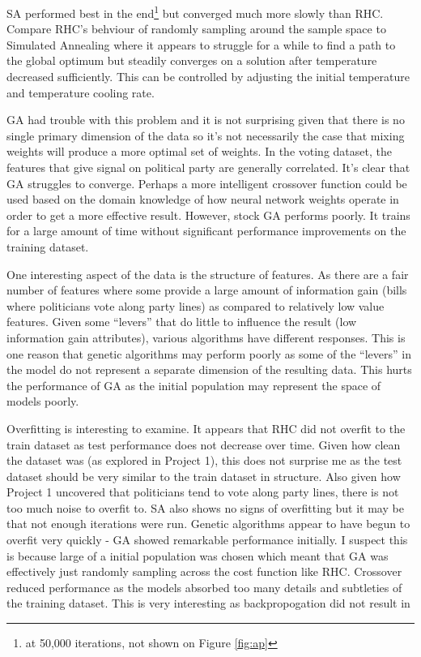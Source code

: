 \documentclass[12pt]{article}
\begin{document}
SA performed best in the end\footnote{at 50,000 iterations, not shown on Figure \ref{fig:ap}} but converged much more slowly than RHC. Compare RHC's behviour of randomly sampling around the sample space to Simulated Annealing where it appears to struggle for a while to find a path to the global optimum but steadily converges on a solution after temperature decreased sufficiently. This can be controlled by adjusting the initial temperature and temperature cooling rate.

GA had trouble with this problem and it is not surprising given that there is no single primary dimension of the data so it's not necessarily the case that mixing weights will produce a more optimal set of weights. In the voting dataset, the features that give signal on political party are generally correlated. It's clear that GA struggles to converge. Perhaps a more intelligent crossover function could be used based on the domain knowledge of how neural network weights operate in order to get a more effective result. However, stock GA performs poorly. It trains for a large amount of time without significant performance improvements on the training dataset.

One interesting aspect of the data is the structure of features. As there are a fair number of features where some provide a large amount of information gain (bills where politicians vote along party lines) as compared to relatively low value features. Given some “levers” that do little to influence the result (low information gain attributes), various algorithms have different responses. This is one reason that genetic algorithms may perform poorly as some of the “levers” in the model do not represent a separate dimension of the resulting data. This hurts the performance of GA as the initial population may represent the space of models poorly.

Overfitting is interesting to examine. It appears that RHC did not overfit to the train dataset as test performance does not decrease over time. Given how clean the dataset was (as explored in Project 1), this does not surprise me as the test dataset should be very similar to the train dataset in structure. Also given how Project 1 uncovered that politicians tend to vote along party lines, there is not too much noise to overfit to. SA also shows no signs of overfitting but it may be that not enough iterations were run. Genetic algorithms appear to have begun to overfit very quickly - GA showed remarkable performance initially. I suspect this is because large of a initial population was chosen which meant that GA was effectively just randomly sampling across the cost function like RHC. Crossover reduced performance as the models absorbed too many details and subtleties of the training dataset. This is very interesting as backpropogation did not result in 
\end{document}
